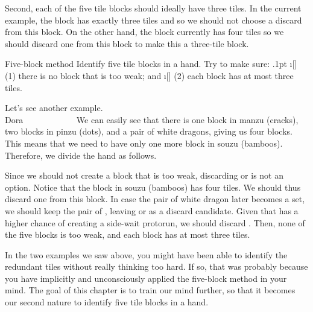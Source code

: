 \bigskip
Second, each of the five tile blocks should ideally have three tiles. In the current example, the {\LARGE{}} block has exactly three tiles and so we should not choose a discard from this block. On the other hand, the {\LARGE{}} block currently has four tiles so we should discard one from this block to make this a three-tile block.

\vfill
\color{MyRed}
\begin{itembox}[c]{Five-block method}\normalcolor
Identify five tile blocks in a hand. Try to make sure:
\bi\itemsep.1pt
\i[] (1) there is no block that is too weak; and
\i[] (2) each block has at most three tiles.
\ei
\end{itembox}\normalcolor

\newpage
Let's see another example.
\bp
{}\bai\bai~\bai\\
\hfill\footnotesize{{\jap Dora}~~~~~~~~~~~~}
\ep
We can easily see that there is one block in {\jap manzu} (cracks), two blocks in {\jap pinzu} (dots), and a pair of white dragons, giving us four blocks. This means that we need to have only one more block in {\jap souzu} (bamboos). Therefore, we divide the hand as follows.

\emj
Since we should not create a block that is too weak, discarding {\LARGE{}} or {\LARGE{}} is not an option. Notice that the block in {\jap souzu} (bamboos) has four tiles. We should thus discard one from this block. In case the pair of white dragon later becomes a set, we should keep the pair of {\LARGE{}}, leaving {\LARGE{}} or {\LARGE{}} as a discard candidate. Given that {\LARGE{}} has a higher chance of creating a side-wait protorun, we should discard {\LARGE{}}.
Then, none of the five blocks is too weak, and each block has at most three tiles.

\bigskip
In the two examples we saw above, you might have been able to identify the redundant tiles without really thinking too hard. If so, that was probably because you have implicitly and unconsciously applied the five-block method in your mind. The goal of this chapter is to train our mind further, so that it becomes our second nature to identify five tile blocks in a hand.

